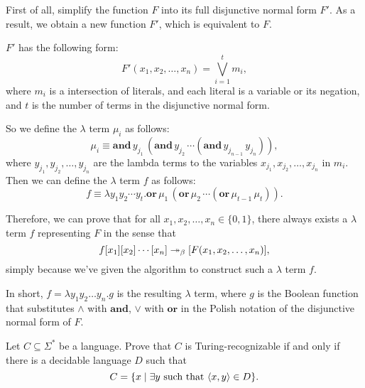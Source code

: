 \documentclass{homework}
\begin{document}
\begin{solution}

  First of all, simplify the function $F$ into its full disjunctive normal form $F'$.
  As a result, we obtain a new function $F'$, which is equivalent to $F$.

  $F'$ has the following form:
  \begin{equation*}
    F'(x_1, x_2, \ldots, x_n) = \bigvee_{i=1}^{t}m_i,
  \end{equation*}
  where $m_i$ is a intersection of literals,
  and each literal is a variable or its negation,
  and $t$ is the number of terms in the disjunctive normal form.

  So we define the $\lambda$ term $\mu_i$ as follows:
  \begin{equation*}
    \mu_i \equiv \mathbf{and}\, y_{j_1}\, (\mathbf{and}\, y_{j_2}\, \cdots (\mathbf{and}\, y_{j_{n-1}}\, y_{j_n})),
  \end{equation*}
  where $y_{j_1}, y_{j_2}, \ldots, y_{j_n}$ are the lambda terms
  to the variables
  $x_{j_1}, x_{j_2}, \ldots, x_{j_n}$ in $m_i$.
  Then we can define the $\lambda$ term $f$ as follows:
  \begin{equation*}
    f \equiv \lambda y_1y_2\cdots y_t. \mathbf{or}\, \mu_1\, (\mathbf{or}\, \mu_2\, \cdots (\mathbf{or}\, \mu_{t-1}\, \mu_{t})).
  \end{equation*}
  
  Therefore, we can prove that for all $x_{1}, x_{2}, \ldots, x_{n} \in \{0,1\}$,
  there always exists a $\lambda$ term $f$ representing $F$ in the sense that
  \begin{equation*}
    f [x_{1}] [x_{2}] \cdots [x_{n}] \twoheadrightarrow_{\beta} [F(x_{1}, x_{2}, \ldots, x_{n})],
  \end{equation*}
  simply because we've given the algorithm to construct such a $\lambda$ term $f$.

  In short, $f = \lambda y_1y_2\ldots y_{n}.g$ is the resulting $\lambda$ term,
  where $g$ is the Boolean function that substitutes $\land$ with $\mathbf{and}$,
  $\lor$ with $\mathbf{or}$ in the Polish notation of the disjunctive normal form of $F$.

\end{solution}

\begin{problem}
  Let $C \subseteq \Sigma^{*}$ be a language.
  Prove that $C$ is Turing-recognizable if and only if there is a decidable language $D$
  such that
  \begin{equation*}
    C = \{ x \mid \exists y \text{ such that } \langle x,y\rangle \in D\}.
  \end{equation*}
\end{problem}
\end{document}
